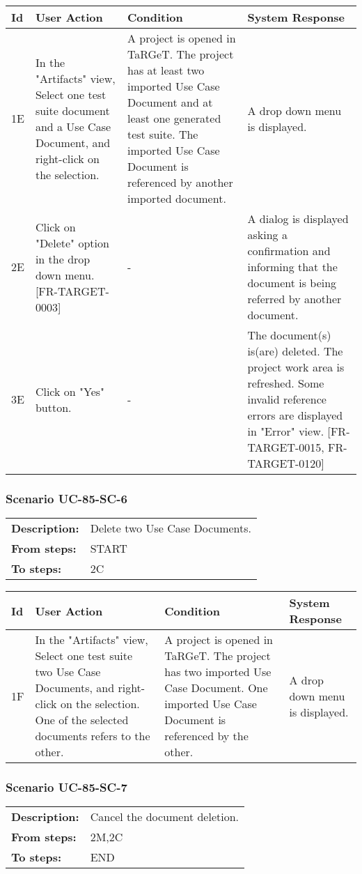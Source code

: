 \documentclass[a4paper,11pt]{article}
\newcommand{\bl}{\\ \hline}
\begin{document}
\begin{tabular}{|p{0.8in}|p{1.6in}|p{1.6in}|p{1.6in}|}
\hline
Id & User Action & Condition & System Response  \bl 
1E & In the "Artifacts" view, Select one test suite document and a Use Case Document, and right-click on the selection. & A project is opened in TaRGeT. The project has at least two imported Use Case Document and at least one generated test suite. The imported Use Case Document is referenced by another imported document. & A drop down menu is displayed. \bl 
2E & Click on "Delete" option in the drop down menu. [FR-TARGET-0003] & - & A dialog is displayed asking a confirmation and informing that the document is being referred by another document. \bl 
3E & Click on "Yes" button. & - & The document(s) is(are) deleted. The project work area is refreshed. Some invalid reference errors are displayed in "Error" view. [FR-TARGET-0015, FR-TARGET-0120] \bl 
\end{tabular}
\subsubsection*{Scenario UC-85-SC-6}
\begin{tabular}{p{1in}p{4in}}
{\bf Description:} & Delete two Use Case Documents. \\
{\bf From steps:} & START \\
{\bf To steps:} & 2C \\
\end{tabular}
 
\begin{tabular}{|p{0.8in}|p{1.6in}|p{1.6in}|p{1.6in}|}
\hline
Id & User Action & Condition & System Response  \bl 
1F & In the "Artifacts" view, Select one test suite two Use Case Documents, and right-click on the selection. One of the selected documents refers to the other. & A project is opened in TaRGeT. The project has two imported Use Case Document. One imported Use Case Document is referenced by the other. & A drop down menu is displayed. \bl 
\end{tabular}
\subsubsection*{Scenario UC-85-SC-7}
\begin{tabular}{p{1in}p{4in}}
{\bf Description:} & Cancel the document deletion. \\
{\bf From steps:} & 2M,2C \\
{\bf To steps:} & END \\
\end{tabular}
 
\end{document}
